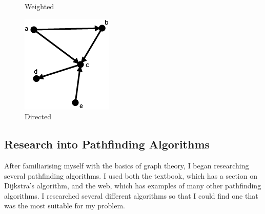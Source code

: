 \documentclass[titlepage]{article}
\begin{document}
\begin{figure}[!htb]
  \caption{Weighted}\label{fig:awesome_image2}
\endminipage\hfill
{}%
  \includegraphics[width=\linewidth]{Direct.png}
  \caption{Directed}\label{fig:awesome_image3}
\endminipage
\end{figure}


\subsection{Research into Pathfinding Algorithms}
After familiarising myself with the basics of graph theory, I began researching several pathfinding algorithms. I used both the textbook, which has a section on Dijkstra's algorithm, and the web, which has examples of many other pathfinding algorithms. I researched several different algorithms so that I could find one that was the most suitable for my problem.
\end{document}
